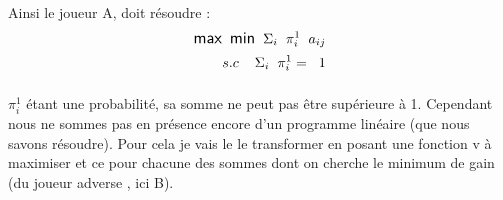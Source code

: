 \documentclass[a4paper, 12pt, twoside]{article}
\begin{document}
{{Ainsi le joueur A, doit résoudre :
\begin{align*}
\large {\textsf{max} \hspace{0.2 cm} \textsf{min} \hspace{0.2 cm} \Sigma_{i}\hspace{0.2 cm} \pi_{i}^{1}\hspace{0.2 cm} a _{ij} } \\ s.c \hspace{0,4 cm}
\large {\Sigma_{i}\hspace{0,2 cm}\pi_{i}^{1} = \hspace{0,2 cm}1}
\end{align*}
\paragraph*{}{$\pi_{i}^{1}$ étant une probabilité, sa somme ne peut pas être supérieure à 1. Cependant nous ne sommes pas en présence encore d'un programme linéaire (que nous savons résoudre). Pour cela je vais le  le transformer  en posant une fonction  \textsf{v} à maximiser et ce pour chacune des sommes dont on cherche le minimum de gain (du joueur adverse , ici B)}. \newline 

}}
\end{document}
